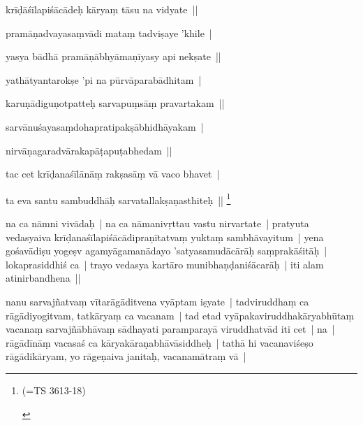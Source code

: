 \documentclass[article,a4paper]{memoir}
\begin{document}
	  \pstart krī\-ḍā\-śī\-lapiśā\-cā\-deḥ kā\-ryaṃ tā\-su na vidyate || 
	\pend
      

	  \pstart pramā\-ṇadvayasaṃvā\-di mataṃ tadviṣaye 'khile | 
	\pend
      

	  \pstart yasya bā\-dhā\- pramā\-ṇā\-bhyā\-maṇī\-yasy api nekṣate || 
	\pend
      

	  \pstart yathā\-tyantarokṣe 'pi na pū\-rvā\-parabā\-dhitam | 
	\pend
      

	  \pstart karuṇā\-diguṇotpatteḥ sarvapuṃsā\-ṃ pravartakam || 
	\pend
      

	  \pstart sarvā\-nuśayasaṃdohapratipakṣā\-bhidhā\-yakam | 
	\pend
      

	  \pstart nirvā\-ṇagaradvā\-rakapā\-ṭapuṭabhedam || 
	\pend
      

	  \pstart tac cet krī\-ḍanaśī\-lā\-nā\-ṃ rakṣasā\-ṃ vā\- vaco bhavet | 
	\pend
      

	  \pstart ta eva santu sambuddhā\-ḥ sarvatallakṣaṇasthiteḥ || \footnote{\begin{english}(=TS 3613-18)\end{english}}
	\pend
      

	  \pstart na ca nā\-mni vivā\-daḥ | na ca nā\-manivṛttau vastu nirvartate | pratyuta vedasyaiva krī\-ḍanaśī\-lapiśā\-cā\-dipraṇī\-tatvaṃ yuktaṃ sambhā\-vayitum | yena gośavā\-diṣu yogeṣv agamyā\-gamanā\-dayo 'satyasamudā\-cā\-rā\-ḥ saṃprakā\-śitā\-ḥ | lokaprasiddhiś ca | trayo vedasya kartā\-ro munibhaṇḍaniśā\-carā\-ḥ | iti alam atinirbandhena || 
	\pend
      

	  \pstart nanu sarvajñatvaṃ vī\-tarā\-gā\-ditvena vyā\-ptam iṣyate | tadviruddhaṃ ca rā\-gā\-diyogitvam, tatkā\-ryaṃ ca vacanam | tad etad vyā\-pakaviruddhakā\-ryabhū\-taṃ vacanaṃ sarvajñā\-bhā\-vaṃ sā\-dhayati paramparayā\- viruddhatvā\-d iti cet | na | rā\-gā\-dī\-nā\-ṃ vacasaś ca kā\-ryakā\-raṇabhā\-vā\-siddheḥ | tathā\- hi vacanaviśeṣo rā\-gā\-dikā\-ryam, yo rā\-geṇaiva janitaḥ, vacanamā\-traṃ vā\- | 
	\pend
      
\end{document}
